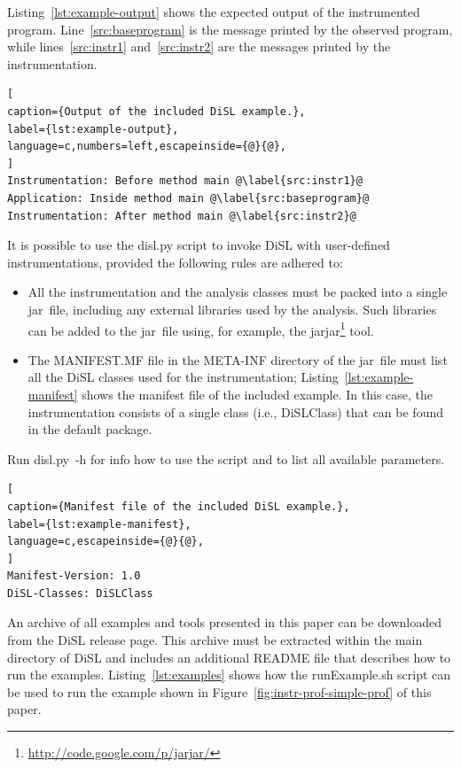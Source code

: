 \documentclass{article}
\newcommand{\brcode}[1]{\textsf{#1}}
\newcommand{\code}[1]{\mbox{\brcode{#1}}}
\begin{document}
\medskip
Listing~\ref{lst:example-output} shows the expected output of the instrumented program.
Line~\ref{src:baseprogram} is the message printed by the observed program, while lines~\ref{src:instr1} and~\ref{src:instr2} are the messages printed by the instrumentation.

\begin{lstlisting}[
caption={Output of the included DiSL example.},
label={lst:example-output},
language=c,numbers=left,escapeinside={@}{@},
]
Instrumentation: Before method main @\label{src:instr1}@
Application: Inside method main @\label{src:baseprogram}@
Instrumentation: After method main @\label{src:instr2}@
\end{lstlisting}


\medskip
It is possible to use the \code{disl.py} script to invoke DiSL with user-defined instrumentations, provided the following rules are adhered to:
\begin{itemize}
\item All the instrumentation and the analysis classes must be packed into a single jar~file, including any external libraries used by the analysis.
Such libraries can be added to the jar~file using, for example, the \code{jarjar}\footnote{\url{http://code.google.com/p/jarjar/}} tool.

\item The \code{MANIFEST.MF} file in the \code{META-INF} directory of the jar~file must list all the DiSL classes used for the instrumentation; Listing~\ref{lst:example-manifest} shows the manifest file of the included example.
In this case, the instrumentation consists of a single class (i.e., \code{DiSLClass}) that can be found in the default package.
\end{itemize}

Run \code{disl.py -h} for info how to use the script and to list all available parameters.

\begin{lstlisting}[
caption={Manifest file of the included DiSL example.},
label={lst:example-manifest},
language=c,escapeinside={@}{@},
]
Manifest-Version: 1.0
DiSL-Classes: DiSLClass
\end{lstlisting}


\medskip
An archive of all examples and tools presented in this paper can be downloaded from the DiSL release page.
This archive must be extracted within the main directory of DiSL and includes an additional \code{README} file that describes how to run the examples.
Listing~\ref{lst:examples} shows how the \code{runExample.sh} script can be used to run the example shown in Figure~\ref{fig:instr-prof-simple-prof} of this paper.
\end{document}
